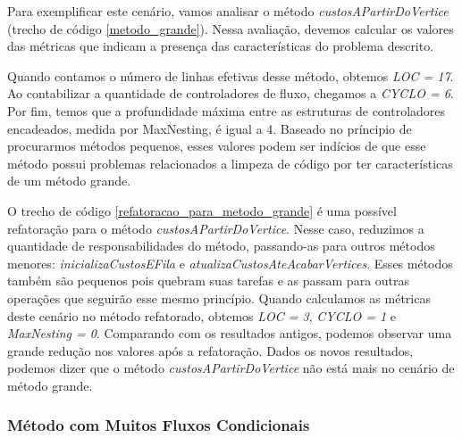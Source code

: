 Para exemplificar este cenário, vamos analisar o método \textit{custosAPartirDoVertice} (trecho de código \ref{metodo_grande}). Nessa avaliação, devemos calcular os valores das métricas que indicam a presença das características do problema descrito. 
                                                                                                                         
                                                            

Quando contamos o número de linhas efetivas desse método, obtemos \textit{LOC = 17}. Ao contabilizar a quantidade de controladores de fluxo, chegamos a \textit{CYCLO = 6}. Por fim, temos que a profundidade máxima entre as estruturas de controladores encadeados, medida por MaxNesting, é igual a 4. Baseado no príncipio de procurarmos métodos pequenos, esses valores podem ser indícios de que esse método possui problemas relacionados a limpeza de código por ter características de um método grande.
                                                      
O trecho de código \ref{refatoracao_para_metodo_grande} é uma possível refatoração para o método \textit{custosAPartirDoVertice}. Nesse caso, reduzimos a quantidade de responsabilidades do método, passando-as para outros métodos menores: \textit{inicializaCustosEFila} e \textit{atualizaCustosAteAcabarVertices}. Esses métodos também são pequenos pois quebram suas tarefas e as passam para outras operações que seguirão esse mesmo princípio. Quando calculamos as métricas deste cenário no método refatorado, obtemos \textit{LOC = 3}, \textit{CYCLO = 1} e \textit{MaxNesting = 0}. Comparando com os resultados antigos, podemos observar uma grande redução nos valores após a refatoração. Dados os novos resultados, podemos dizer que o método \textit{custosAPartirDoVertice} não está mais no cenário de método grande.

                                                            

	
\subsubsection{Método com Muitos Fluxos Condicionais}
                  
